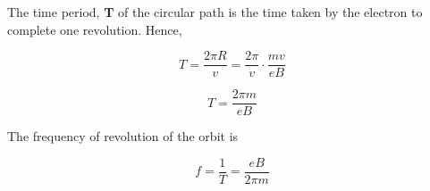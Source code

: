 \documentclass[a4paper,20pt,twoside]{report}
\begin{document}
	\vspace{4mm}
	
	The time period, \textbf{T} of the circular path is the time taken by the electron to complete one revolution. Hence, 
	
	\begin{equation}
	T = \frac{2 \pi R}{v} = \frac{2\pi}{v} \cdot \frac{mv}{eB}
	\end{equation}
	

	\begin{equation}
	T = \frac{2\pi m}{eB}
	\end{equation}

	\vspace{4mm}
	
	The frequency of revolution of the orbit is 
	
	\begin{equation}
	f = \frac{1}{T} =\frac{eB}{2 \pi m}
	\end{equation}
	
  	
\end{document}
